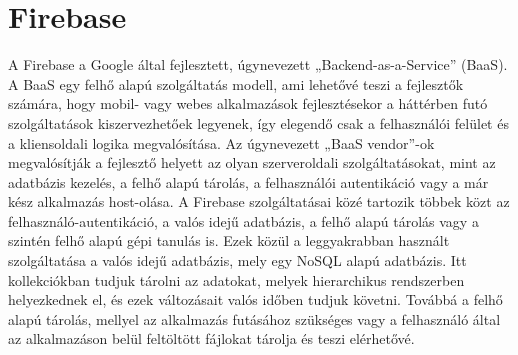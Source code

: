 \documentclass[12pt, twoside]{report}
\begin{document}
\section{Firebase}
A Firebase a Google által fejlesztett, úgynevezett „Backend-as-a-Service” (BaaS).
A BaaS egy felhő alapú szolgáltatás modell, ami lehetővé teszi a fejlesztők számára, hogy mobil- vagy webes alkalmazások fejlesztésekor a háttérben futó szolgáltatások kiszervezhetőek legyenek, így elegendő csak a felhasználói felület és a kliensoldali logika megvalósítása. Az úgynevezett „BaaS vendor”-ok megvalósítják a fejlesztő helyett az olyan szerveroldali szolgáltatásokat, mint az adatbázis kezelés, a felhő alapú tárolás, a felhasználói autentikáció vagy a már kész alkalmazás host-olása.
A Firebase szolgáltatásai közé tartozik többek közt az felhasználó-autentikáció, a valós idejű adatbázis, a felhő alapú tárolás vagy a szintén felhő alapú gépi tanulás is.
Ezek közül a leggyakrabban használt szolgáltatása a valós idejű adatbázis, mely egy NoSQL alapú adatbázis. Itt kollekciókban tudjuk tárolni az adatokat, melyek hierarchikus rendszerben helyezkednek el, és ezek változásait valós időben tudjuk követni. Továbbá a felhő alapú tárolás, mellyel az alkalmazás futásához szükséges vagy a felhasználó által az alkalmazáson belül feltöltött fájlokat tárolja és teszi elérhetővé.
\end{document}
